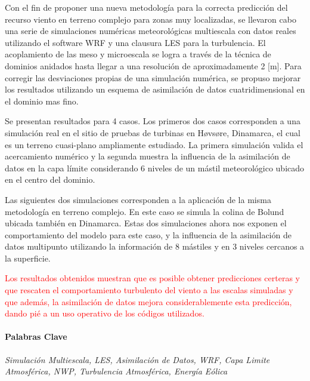 Con el fin de proponer una nueva metodología para la correcta predicción del recurso viento en terreno complejo para zonas muy localizadas, se llevaron cabo una serie de simulaciones numéricas meteorológicas multiescala con datos reales utilizando el software WRF y una clausura LES para la turbulencia.
El acoplamiento de las meso y microescala se logra a través de la técnica de dominios anidados hasta llegar a una resolución de aproximadamente 2 [m]. Para corregir las desviaciones propias de una simulación numérica, se propuso mejorar los resultados utilizando un esquema de asimilación de datos cuatridimensional en el dominio mas fino.

Se presentan resultados para 4 casos. Los primeros dos casos corresponden a una simulación real en el sitio de pruebas de turbinas en Høvsøre, Dinamarca, el cual es un terreno cuasi-plano ampliamente estudiado. La primera simulación valida el acercamiento numérico y la segunda muestra la influencia de la asimilación de datos en la capa límite considerando 6 niveles de un mástil meteorológico ubicado en el centro del dominio.

Las siguientes dos simulaciones corresponden a la aplicación de la misma metodología en terreno complejo. En este caso se simula la colina de Bolund ubicada también en Dinamarca. Estas dos simulaciones ahora nos exponen el comportamiento del modelo para este caso, y la influencia de la asimilación de datos multipunto utilizando la información de 8 mástiles y en 3 niveles cercanos a la superficie.

\textcolor{red}{Los resultados obtenidos muestran que es posible obtener predicciones certeras y que rescaten el comportamiento turbulento del viento a las escalas simuladas y que además, la asimilación de datos mejora considerablemente esta predicción, dando pié a un uso operativo de los códigos utilizados.}

\paragraph{Palabras Clave} \emph{Simulación Multiescala, LES, Asimilación de Datos, WRF, Capa Limite Atmosférica, NWP, Turbulencia Atmosférica, Energía Eólica}